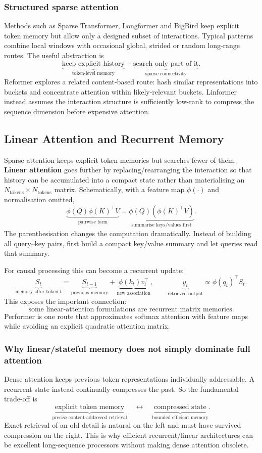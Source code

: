 \subsubsection{Structured sparse attention}
Methods such as Sparse Transformer, Longformer and BigBird keep explicit token memory but allow only a designed subset of interactions.
Typical patterns combine local windows with occasional global, strided or random long-range routes.
The useful abstraction is
\[
\underbrace{\text{keep explicit history}}_{\text{token-level memory}}
+
\underbrace{\text{search only part of it}}_{\text{sparse connectivity}}.
\]
Reformer explores a related content-based route: hash similar representations into buckets and concentrate attention within likely-relevant buckets.
Linformer instead assumes the interaction structure is sufficiently low-rank to compress the sequence dimension before expensive attention.

\subsection{Linear Attention and Recurrent Memory}
Sparse attention keeps explicit token memories but searches fewer of them.
\textbf{Linear attention} goes further by replacing/rearranging the interaction so that history can be accumulated into a compact state rather than materialising an $N_{\text{tokens}}\times N_{\text{tokens}}$ matrix.
Schematically, with a feature map $\phi(\cdot)$ and normalisation omitted,
\[
\underbrace{\phi(Q)\phi(K)^\top V}_{\text{pairwise form}}
=
\underbrace{\phi(Q)\left(\phi(K)^\top V\right)}_{\text{summarise keys/values first}}.
\]
The parenthesisation changes the computation dramatically.
Instead of building all query--key pairs, first build a compact key/value summary and let queries read that summary.

For causal processing this can become a recurrent update:
\[
\underbrace{S_t}_{\text{memory after token }t}
=
\underbrace{S_{t-1}}_{\text{previous memory}}
+
\underbrace{\phi(k_t)v_t^\top}_{\text{new association}},
\qquad
\underbrace{y_t}_{\text{retrieved output}}
\propto
\phi(q_t)^\top S_t.
\]
This exposes the important connection:
\[
\boxed{\text{some linear-attention formulations are recurrent matrix memories}.}
\]
Performer is one route that approximates softmax attention with feature maps while avoiding an explicit quadratic attention matrix.

\subsubsection{Why linear/stateful memory does not simply dominate full attention}
Dense attention keeps previous token representations individually addressable.
A recurrent state instead continually compresses the past.
So the fundamental trade-off is
\[
\underbrace{\text{explicit token memory}}_{\text{precise content-addressed retrieval}}
\quad\longleftrightarrow\quad
\underbrace{\text{compressed state}}_{\text{bounded efficient memory}}.
\]
Exact retrieval of an old detail is natural on the left and must have survived compression on the right.
This is why efficient recurrent/linear architectures can be excellent long-sequence processors without making dense attention obsolete.

